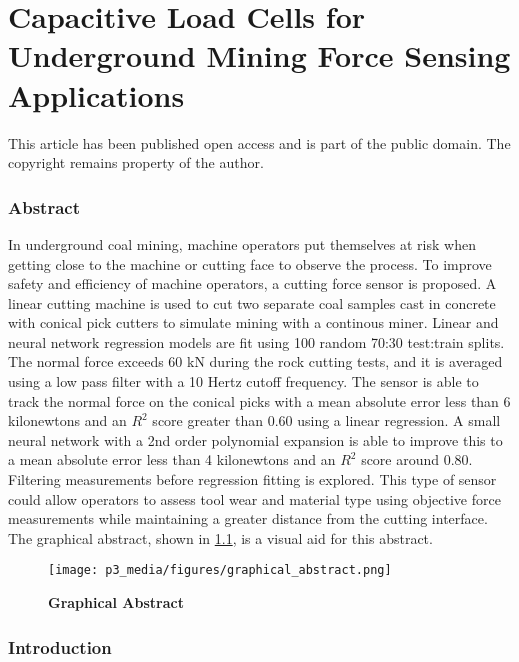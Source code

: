 \chapter{Capacitive Load Cells for Underground Mining Force Sensing Applications
\label{chap:P3}}

\begin{center}
This article has been published open access and is part of the public domain.
The copyright remains property of the author.
\end{center}

\subsection{Abstract}

In underground coal mining, machine operators put themselves at risk when 
getting close to the machine or cutting face to observe the process.
To improve safety and efficiency of machine operators, 
a cutting force sensor is proposed.
A linear cutting machine is used to cut two separate coal samples
cast in concrete with conical pick cutters to simulate mining with a continous miner. 
Linear and neural network regression models are fit using 100 random 70:30 test:train splits.
The normal force exceeds 60 kN during the rock cutting tests,
and it is averaged using a low pass filter with a 10 Hertz cutoff frequency.
The sensor is able to track the normal force on the conical picks with a 
mean absolute error less than 6 kilonewtons and an $R^2$ score greater than 0.60 using a linear regression.
A small neural network with a 2nd order polynomial expansion is able to 
improve this to a mean absolute error less than 4 kilonewtons and an $R^2$ score around 0.80. 
Filtering measurements before regression fitting is explored.
This type of sensor could allow operators to assess tool wear and material type
using objective force measurements while maintaining a greater distance from the cutting interface.
The graphical abstract, shown in \ref{p3:graphical}, is a visual aid for this abstract.

\begin{figure}[H]
\centering
\texttt{[image: p3\_media/figures/graphical\_abstract.png]}
\caption{\bfseries{Graphical Abstract} \\}
\label{p3:graphical}
\end{figure}

\subsection{Introduction}\label{sec1}

